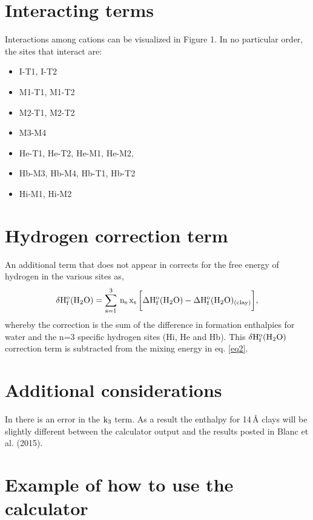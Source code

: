 \documentclass[12pt]{article} %
\numberwithin{equation}{section}
\numberwithin{table}{section}
\numberwithin{figure}{section}
\begin{document}
\section{Interacting terms}

Interactions among cations can be visualized in \cite{Blanc2015} Figure 1. In no particular order, the sites that interact are:
\begin{itemize}
\item[] I-T1, I-T2
\item[] M1-T1, M1-T2
\item[] M2-T1, M2-T2
\item[] M3-M4
\item[] He-T1, He-T2, He-M1, He-M2, 
\item[] Hb-M3, Hb-M4, Hb-T1, Hb-T2
\item[] Hi-M1, Hi-M2
\end{itemize}

\section{Hydrogen correction term}
\label{secWater}
An additional term that does not appear in \cite{Blanc2015} corrects for the free energy of hydrogen in the various sites as,
\begin{equation}
\rm \delta H_f^o(H_2O) =  \sum_{s = 1}^{3}\,n_s\,x_s\,\bigg{[}\Delta H_f^o(H_2O)-\Delta H_f^o(H_2O)_{(clay)}\bigg{]}, 
\end{equation}
whereby the correction is the sum of the difference in formation enthalpies for water and the n=3 specific hydrogen sites (Hi, He and Hb). This $\rm \delta H_f^o(H_2O)$ correction term is subtracted from the mixing energy in eq. \ref{eq2}. 

\section{Additional considerations}

In \cite{Blanc2015} there is an error in the $\rm k_3$ term. As a result the enthalpy for 14\,\r{A} clays will be slightly different between the calculator output and the results posted in Blanc et al. (2015).
\newpage

\section{Example of how to use the calculator}
\end{document}
